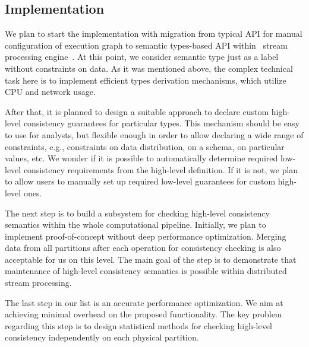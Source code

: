 \subsection{Implementation}

We plan to start the implementation with migration from typical API for manual configuration of execution graph to semantic types-based API within \FlameStream\ stream processing engine~\cite{we2018beyondmr}. At this point, we consider semantic type just as a label without constraints on data. As it was mentioned above, the complex technical task here is to implement efficient types derivation mechanisms, which utilize CPU and network usage.

After that, it is planned to design a suitable approach to declare custom high-level consistency guarantees for particular types. This mechanism should be easy to use for analysts, but flexible enough in order to allow declaring a wide range of constraints, e.g., constraints on data distribution, on a schema, on particular values, etc.  We wonder if it is possible to automatically determine required low-level consistency requirements from the high-level definition. If it is not, we plan to allow users to manually set up required low-level guarantees for custom high-level ones.

The next step is to build a subsystem for checking high-level consistency semantics within the whole computational pipeline. Initially, we plan to implement proof-of-concept without deep performance optimization. Merging data from all partitions after each operation for consistency checking is also acceptable for us on this level. The main goal of the step is to demonstrate that maintenance of high-level consistency semantics is possible within distributed stream processing.

The last step in our list is an accurate performance optimization. We aim at achieving minimal overhead on the proposed functionality. The key problem regarding this step is to design statistical methods for checking high-level consistency independently on each physical partition.
